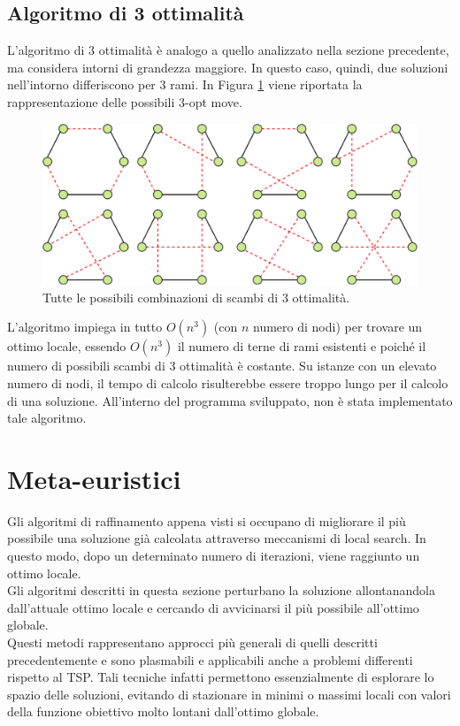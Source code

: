\subsection{Algoritmo di 3 ottimalità}
L'algoritmo di 3 ottimalità è analogo a quello analizzato nella sezione precedente, ma considera intorni di grandezza maggiore. In questo caso, quindi, due soluzioni nell'intorno differiscono per 3 rami. In Figura \ref{three_optimality} viene riportata la rappresentazione delle possibili 3-opt move.\\
\begin{figure}[H] 
\begin{center} 
  \includegraphics[scale=0.35]{Images/3_swap}
  \caption{\footnotesize{Tutte le possibili combinazioni di scambi di 3 ottimalità.}}
  \label{three_optimality}
\end{center}
\end{figure}
L'algoritmo impiega in tutto $O(n^3)$ (con $n$ numero di nodi) per trovare un ottimo locale, essendo $O(n^3)$ il numero di terne di rami esistenti e poiché il numero di possibili scambi di 3 ottimalità è costante. Su istanze con un elevato numero di nodi, il tempo di calcolo risulterebbe essere troppo lungo per il calcolo di una soluzione. All'interno del programma sviluppato, non è stata implementato tale algoritmo.

\section{Meta-euristici}
Gli algoritmi di raffinamento appena visti si occupano di migliorare il più possibile una soluzione già calcolata attraverso meccanismi di local search. In questo modo, dopo un determinato numero di iterazioni, viene raggiunto un ottimo locale.\\
Gli algoritmi descritti in questa sezione perturbano la soluzione allontanandola dall'attuale ottimo locale e cercando di avvicinarsi il più possibile all'ottimo globale.\\
Questi metodi rappresentano approcci più generali di quelli descritti precedentemente e sono plasmabili e applicabili anche a problemi differenti rispetto al TSP. Tali tecniche infatti permettono essenzialmente di esplorare lo spazio delle soluzioni, evitando di stazionare in minimi o massimi locali con valori della funzione obiettivo molto lontani dall'ottimo globale.

